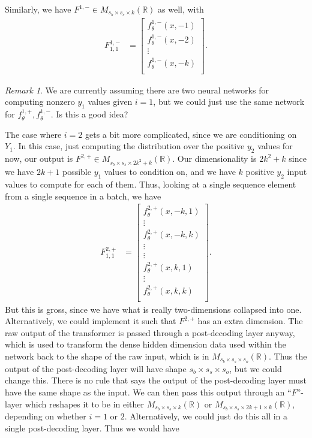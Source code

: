 \documentclass[12pt, reqno]{amsart}
\theoremstyle{definition}
\theoremstyle{definition}
\theoremstyle{plain}
\theoremstyle{definition}
\theoremstyle{remark}
\newtheorem{rem}[theorem]{Remark}
\newcommand{\R}{\mathbb{R}}				%
\newcommand{\bee}{\begin{equation}\begin{aligned}}
\newcommand{\eee}{\end{aligned}\end{equation}}
\renewcommand{\'}{\hspace{0.5mm}'}			%
\begin{document}
Similarly, we have $F^{1,-} \in M_{s_b \times s_s \times k} (\R)$ as well, with 
\bee
	F^{1,-}_{1,1}
	&=
	\begin{bmatrix}
		f_\theta^{1,-}(x,-1) \\
		f_\theta^{1,-}(x,-2) \\
		\vdots \\
		f_\theta^{1,-}(x,-k) \\
	\end{bmatrix}. 
\eee

\begin{rem}
	We are currently assuming there are two neural networks for computing nonzero $y_1$ values given $i = 1$, but we could just use the same network for $f_\theta^{1,+}, f_\theta^{1,-}$. Is this a good idea?
\end{rem}

The case where $i = 2$ gets a bit more complicated, since we are conditioning on $Y_1$. In this case, just computing the distribution over the positive $y_2$ values for now, our output is $F^{2,+} \in M_{s_b \times s_s \times 2k^2 + k} (\R)$. Our dimensionality is $2k^2 + k$ since we have $2k + 1$ possible $y_1$ values to condition on, and we have $k$ positive $y_2$ input values to compute for each of them. Thus, looking at a single sequence element from a single sequence in a batch, we have
\bee
	F_{1,1}^{2,+}
	&=
		\begin{bmatrix}
			f_\theta^{2,+}(x,-k,1) \\
			\vdots \\
			f_\theta^{2,+}(x,-k,k) \\
			\vdots \\
			\vdots \\
			f_\theta^{2,+}(x,k,1) \\
			\vdots \\
			f_\theta^{2,+}(x,k,k) \\
		\end{bmatrix}. 
\eee
But this is gross, since we have what is really two-dimensions collapsed into one. Alternatively, we could implement it such that $F^{2,+}$ has an extra dimension. The raw output of the transformer is passed through a post-decoding layer anyway, which is used to transform the dense hidden dimension data used within the network back to the shape of the raw input, which is in $M_{s_b \times s_s \times s_o}(\R)$. Thus the output of the post-decoding layer will have shape $s_b \times s_s \times s_o$, but we could change this. There is no rule that says the output of the post-decoding layer must have the same shape as the input. We can then pass this output through an ``$F$''-layer which reshapes it to be in either $M_{s_b \times s_s \times k}(\R)$ or $M_{s_b \times s_s \times 2k + 1 \times k}(\R)$, depending on whether $i = 1$ or $2$. Alternatively, we could just do this all in a single post-decoding layer. Thus we would have 
\end{document}
